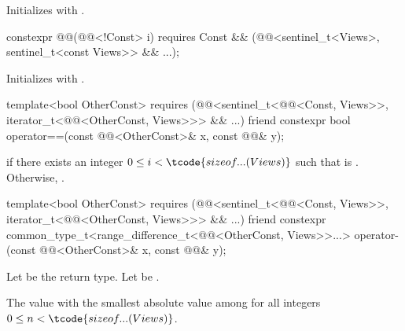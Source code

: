 \begin{itemdescr}
\pnum
\effects
Initializes  with .
\end{itemdescr}

%
\begin{itemdecl}
constexpr @@(@@<!Const> i)
  requires Const && (@@<sentinel_t<Views>, sentinel_t<const Views>> && ...);
\end{itemdecl}

\begin{itemdescr}
\pnum
\effects
Initializes  with .
\end{itemdescr}

%
\begin{itemdecl}
template<bool OtherConst>
  requires (@@<sentinel_t<@@<Const, Views>>,
                         iterator_t<@@<OtherConst, Views>>> && ...)
friend constexpr bool operator==(const @@<OtherConst>& x, const @@& y);
\end{itemdecl}

\begin{itemdescr}
\pnum
\returns
{} if there exists an integer $0 \leq i < \tcode{sizeof...(Views)}$
such that  is .
Otherwise, .
\end{itemdescr}

%
\begin{itemdecl}
template<bool OtherConst>
  requires (@@<sentinel_t<@@<Const, Views>>,
                               iterator_t<@@<OtherConst, Views>>> && ...)
friend constexpr common_type_t<range_difference_t<@@<OtherConst, Views>>...>
  operator-(const @@<OtherConst>& x, const @@& y);
\end{itemdecl}

\begin{itemdescr}
\pnum
Let  be the return type.
Let  be
.

\pnum
\returns
The value with the smallest absolute value among 
for all integers $0 \leq n < \tcode{sizeof...(Views)}$.
\end{itemdescr}

